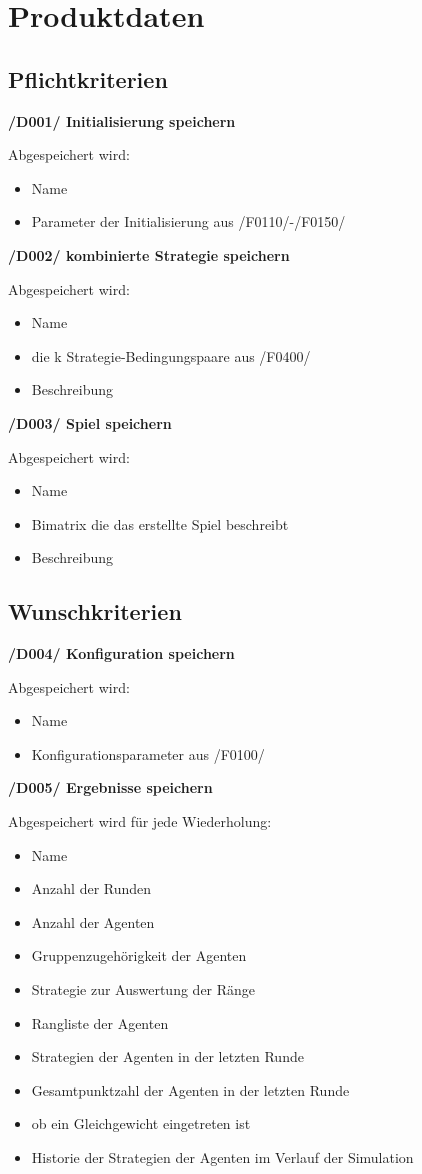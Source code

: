 \section{Produktdaten}

\subsection{Pflichtkriterien}

\textbf{/D001/ Initialisierung speichern}

Abgespeichert wird:
\begin{itemize}
\item Name
\item Parameter der Initialisierung aus /F0110/-/F0150/
\end{itemize}

\textbf{/D002/ kombinierte Strategie speichern}

Abgespeichert wird:
\begin{itemize}
\item Name
\item die k Strategie-Bedingungspaare aus /F0400/ 
\item Beschreibung
\end{itemize}

\textbf{/D003/ Spiel speichern}

Abgespeichert wird:
\begin{itemize}
\item Name 
\item Bimatrix die das erstellte Spiel beschreibt
\item Beschreibung
\end{itemize}

\subsection{Wunschkriterien}

\textbf{/D004/ Konfiguration speichern}

Abgespeichert wird:
\begin{itemize}
\item Name
\item Konfigurationsparameter aus /F0100/
\end{itemize}

\textbf{/D005/ Ergebnisse speichern}	

Abgespeichert wird für jede Wiederholung:
\begin{itemize}
\item Name
\item Anzahl der Runden
\item Anzahl der Agenten
\item Gruppenzugehörigkeit der Agenten
\item Strategie zur Auswertung der Ränge
\item Rangliste der Agenten
\item Strategien der Agenten in der letzten Runde
\item Gesamtpunktzahl der Agenten in der letzten Runde
\item ob ein Gleichgewicht eingetreten ist
\item Historie der Strategien der Agenten im Verlauf der Simulation
\end{itemize}